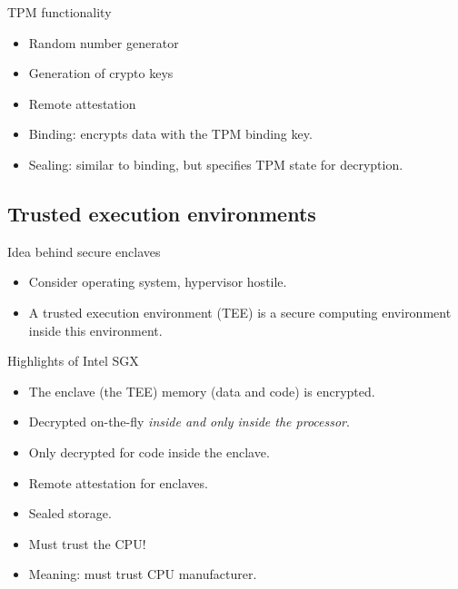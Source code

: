 \begin{frame}
  \begin{block}{TPM functionality}
    \begin{itemize}
      \item Random number generator
      \item Generation of crypto keys
      \item Remote attestation
      \item Binding: encrypts data with the TPM binding key.
      \item Sealing: similar to binding, but specifies TPM state for 
        decryption.
    \end{itemize}
  \end{block}
\end{frame}

\subsection{Trusted execution environments}

\begin{frame}
  \begin{block}{Idea behind secure enclaves}
    \begin{itemize}
      \item Consider operating system, hypervisor hostile.
      \item A trusted execution environment (TEE) is a secure computing 
        environment inside this environment.
    \end{itemize}
  \end{block}
\end{frame}

\begin{frame}
  \begin{block}{Highlights of Intel SGX}
    \begin{itemize}
      \item The enclave (the TEE) memory (data and code) is encrypted.
      \item Decrypted on-the-fly \emph{inside and only inside the processor}.
      \item Only decrypted for code inside the enclave.
      \item Remote attestation for enclaves.
      \item Sealed storage.
    \end{itemize}
  \end{block}

  \pause

  \begin{remark}
    \begin{itemize}
      \item Must trust the CPU!
      \item Meaning: must trust CPU manufacturer.
    \end{itemize}
  \end{remark}
\end{frame}

